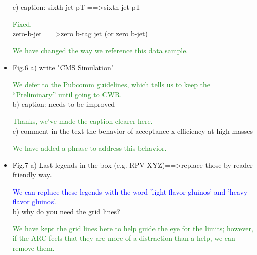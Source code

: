 \documentclass[paper=a4, fontsize=11pt]{scrartcl}
\begin{document}
\begin{itemize}
c) caption: 
sixth-jet-pT ==\textgreater sixth-jet pT 

\textcolor{ForestGreen}{Fixed.}\\

zero-b-jet ==\textgreater zero b-tag jet (or zero b-jet) 

\textcolor{ForestGreen}{We have changed the way we reference this data sample.}\\


\item Fig.6 
a) write "CMS Simulation" 

\textcolor{ForestGreen}{We defer to the Pubcomm guidelines, which tells us to keep the ``Preliminary'' until
going to CWR.}\\


b) caption: needs to be improved

\textcolor{ForestGreen}{Thanks, we've made the caption clearer here.}\\


c) comment in the text the behavior of acceptance x efficiency at high masses 

\textcolor{ForestGreen}{We have added a phrase to address this behavior.}


\item Fig.7 
a) Last legends in the box (e.g. RPV XYZ)==\textgreater replace those by reader friendly way. 

\textcolor{Blue}{We can replace these legends with the word 'light-flavor gluinos' and 'heavy-flavor
gluinos'.}\\


b) why do you need the grid lines? 

\textcolor{ForestGreen}{We have kept the grid lines here to help guide the eye for the limits; however,
if the ARC feels that they are more of a distraction than a help, we can remove them.}\\


\end{itemize}
\end{document}
